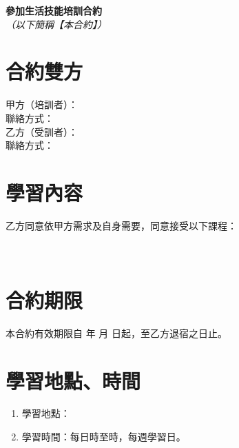 \documentclass[12pt]{article}
\begin{document}
\allsectionsfont{\sffamily}
	\begin{center}
		\huge\textsf{\textbf{參加生活技能培訓合約}}\\
		\normalsize\textit{（以下簡稱【本合約】）}
	\end{center}
	\section{合約雙方}
	
		甲方（培訓者）：\underline{\hspace{20em}}\\
		聯絡方式：\underline{\hspace{22.5em}}\\
		
		乙方（受訓者）：\underline{\hspace{20em}}\\
		聯絡方式：\underline{\hspace{22.5em}}\\
	
	\section{學習內容}
		乙方同意依甲方需求及自身需要，同意接受以下課程：\\
		\underline{\hspace{15cm}}\\
		\underline{\hspace{15cm}}\\
	\section{合約期限}
		本合約有效期限自 \underline{\hspace{2cm}} 年 \underline{\hspace{1cm}} 月 \underline{\hspace{1cm}} 日起，至乙方退宿之日止。
	\section{學習地點、時間}
		\begin{enumerate}
			\item 學習地點：\underline{\hspace{19em}}
			\item 學習時間：每日\underline{\hspace{2em}}時至\underline{\hspace{2em}}時，每週學習\underline{\hspace{2em}}日。
		\end{enumerate}
\end{document}
